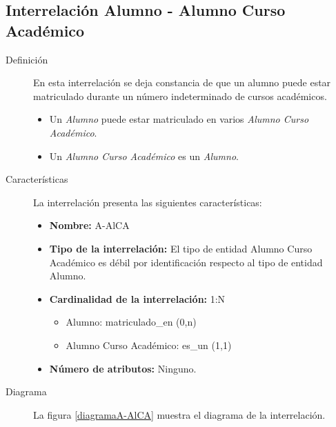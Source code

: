 \subsection{Interrelación Alumno - Alumno Curso Académico}

   \begin{description}
      \item[Definición] En esta interrelación se deja constancia de que un
      alumno puede estar matriculado durante un número indeterminado de cursos
      académicos.

      \begin{itemize}
       \item Un \textit{Alumno} puede estar matriculado en varios \textit{Alumno
             Curso Académico}.
       \item Un \textit{Alumno Curso Académico} es un \textit{Alumno}.
      \end{itemize}

      \item[Características] La interrelación presenta las siguientes
                             características:

         \begin{itemize}
            \item \textbf{Nombre:} A-AlCA
            \item \textbf{Tipo de la interrelación:} El tipo de entidad
                  Alumno Curso Académico es débil por identificación respecto al
                  tipo de entidad Alumno.
            \item \textbf{Cardinalidad de la interrelación:} 1:N
                  \begin{itemize}
                     \item Alumno: matriculado\_en (0,n)
                     \item Alumno Curso Académico: es\_un (1,1)
                  \end{itemize}
            \item \textbf{Número de atributos:} Ninguno.
         \end{itemize}

      \item[Diagrama] La figura \ref{diagramaA-AlCA} muestra el diagrama de la
                      interrelación.


\end{description}
